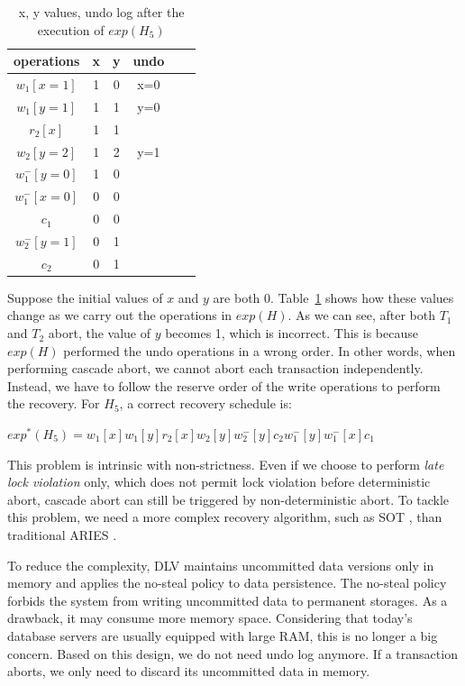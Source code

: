 \documentclass[conference]{IEEEtran}
\begin{document}
\begin{table}[htb]
  \centering
  \begin{tabular}{|c|c|c|c|c|c|}
  \hline
operations & x &  y & undo   \\
  \hline
  \hline
  $w_1[x=1]$ & 1 & 0 & x=0  \\
  \hline
  $w_1[y=1]$ & 1 & 1 & y=0   \\
  \hline
  $r_2[x]$ & 1 & 1 &    \\
  \hline
  $w_2[y=2]$ & 1 & 2 & y=1  \\
  \hline
  $w^-_1[y=0]$ & 1 & 0 &   \\
  \hline
  $w^-_1[x=0]$ & 0 & 0 &   \\
  \hline

  $c_1$ & 0 & 0 &   \\
  \hline
  $w^-_2[y=1]$ & 0 & 1 &    \\
  \hline
  $c_2$ & 0 & 1 &  \\
  \hline
  \end{tabular}
\caption{x, y values, undo log after the execution of ${exp(H_5)}$}
\label{tbl:x_y_vlues}
\end{table}


Suppose the initial values of ${x}$ and ${y}$ are both 0.
Table~\ref{tbl:x_y_vlues} shows how these values change as we carry out the operations in $exp(H)$.
As we can see, after both ${T_1}$ and ${T_2}$ abort, the value of ${y}$ becomes 1, which is incorrect.
This is because $exp(H)$ performed the undo operations in a wrong order.
In other words, when performing cascade abort, we cannot abort each transaction independently.
Instead, we have to follow the reserve order of the write operations to perform the recovery.
For ${H_5}$, a correct recovery schedule is:
\begin{center}
${exp^*(H_5) = w_1[x]w_1[y]r_2[x]w_2[y]w^-_2[y]c_2w^-_1[y]w^-_1[x]c_1}$
\end{center}


This problem is intrinsic with non-strictness.
Even if we choose to perform \emph{late lock violation} only, which does not permit lock violation before deterministic abort,
cascade abort can still be triggered by non-deterministic abort.
To tackle this problem, we need a more complex recovery algorithm, such as SOT \cite{UnifyCR:journals/is/AlonsoVABASW94},
than traditional ARIES \cite{ARIES:journals/tods/MohanHLPS92}.


To reduce the complexity, DLV maintains uncommitted data versions only in memory and applies the no-steal policy to data persistence.
The no-steal policy forbids the system from writing uncommitted data to permanent storages.
As a drawback, it may consume more memory space.
Considering that today's database servers are usually equipped with large RAM, this is no longer a big concern.
Based on this design, we do not need undo log anymore. If a transaction aborts, we only need to discard its uncommitted data in memory.
\end{document}
